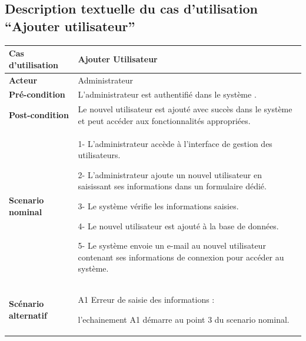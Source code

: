 \subsection{Description textuelle du cas d’utilisation “Ajouter utilisateur”}
\begin{table}[H]
  \centering
  \renewcommand{\arraystretch}{1.1}
  \begin{tabular}{|p{4cm}|p{9cm}|}
    \hline
    \textbf{Cas d'utilisation}   & Ajouter Utilisateur                                                                                           \\
    \hline
    \textbf{Acteur}              & Administrateur                                                                                                \\
    \hline
    \textbf{Pré-condition}       & L'administrateur est authentifié dans le système .                                                            \\
    \hline
    \textbf{Post-condition}      & Le nouvel utilisateur est ajouté avec succès dans le système et peut accéder aux fonctionnalités appropriées. \\
    \hline
    \textbf{Scenario nominal}    & 1- L'administrateur accède à l'interface de gestion des utilisateurs.\newline

    2- L'administrateur ajoute un nouvel utilisateur en saisissant ses informations dans un formulaire dédié.\newline

    3- Le système vérifie les informations saisies.\newline
    
    4- Le nouvel utilisateur est ajouté à la base de données.\newline

    5- Le système envoie un e-mail au nouvel utilisateur contenant ses informations de connexion pour accéder au système.                        \\
    \hline
    \textbf{Scénario alternatif} & A1 Erreur de saisie des informations : \newline

    l'echainement A1 démarre au point 3 du scenario nominal.                                                                                     \\
  \end{tabular}

\end{table}


